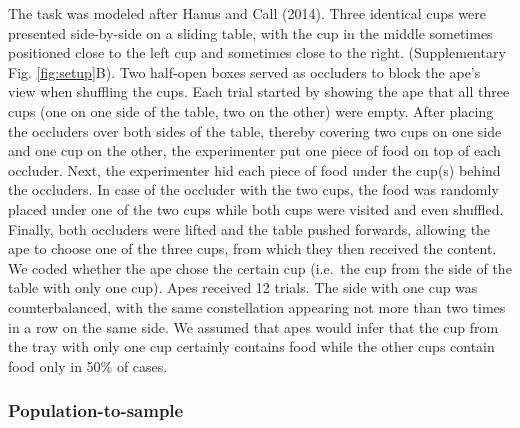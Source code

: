 \documentclass[
  man,floatsintext]{apa6}
\begin{document}
The task was modeled after Hanus and Call (2014). Three identical cups were presented side-by-side on a sliding table, with the cup in the middle sometimes positioned close to the left cup and sometimes close to the right. (Supplementary Fig. \ref{fig:setup}B). Two half-open boxes served as occluders to block the ape's view when shuffling the cups. Each trial started by showing the ape that all three cups (one on one side of the table, two on the other) were empty. After placing the occluders over both sides of the table, thereby covering two cups on one side and one cup on the other, the experimenter put one piece of food on top of each occluder. Next, the experimenter hid each piece of food under the cup(s) behind the occluders. In case of the occluder with the two cups, the food was randomly placed under one of the two cups while both cups were visited and even shuffled. Finally, both occluders were lifted and the table pushed forwards, allowing the ape to choose one of the three cups, from which they then received the content. We coded whether the ape chose the certain cup (i.e.~the cup from the side of the table with only one cup). Apes received 12 trials. The side with one cup was counterbalanced, with the same constellation appearing not more than two times in a row on the same side. We assumed that apes would infer that the cup from the tray with only one cup certainly contains food while the other cups contain food only in 50\% of cases.

\subsubsection{Population-to-sample}\label{population-to-sample}
\end{document}
